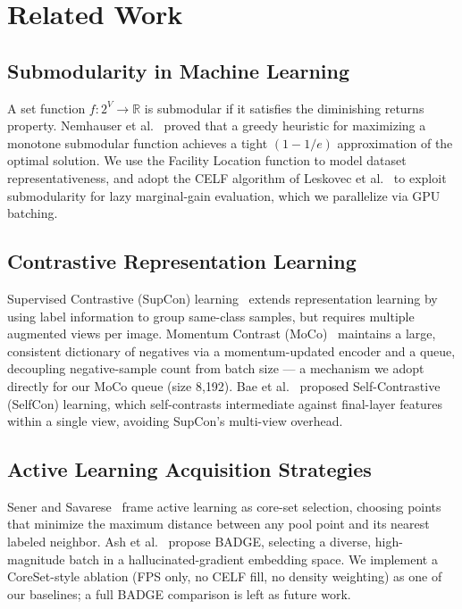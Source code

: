 \documentclass[conference]{IEEEtran}
\begin{document}
\section{Related Work}

\subsection{Submodularity in Machine Learning}
A set function $f: 2^V \to \mathbb{R}$ is submodular if it satisfies the diminishing returns property. Nemhauser et al.~\cite{nemhauser1978analysis} proved that a greedy heuristic for maximizing a monotone submodular function achieves a tight $(1-1/e)$ approximation of the optimal solution. We use the Facility Location function to model dataset representativeness, and adopt the CELF algorithm of Leskovec et al.~\cite{leskovec2007cost} to exploit submodularity for lazy marginal-gain evaluation, which we parallelize via GPU batching.

\subsection{Contrastive Representation Learning}
Supervised Contrastive (SupCon) learning~\cite{khosla2020supcon} extends representation learning by using label information to group same-class samples, but requires multiple augmented views per image. Momentum Contrast (MoCo)~\cite{he2020momentum} maintains a large, consistent dictionary of negatives via a momentum-updated encoder and a queue, decoupling negative-sample count from batch size — a mechanism we adopt directly for our MoCo queue (size 8{,}192). Bae et al.~\cite{bae2021selfcon} proposed Self-Contrastive (SelfCon) learning, which self-contrasts intermediate against final-layer features within a single view, avoiding SupCon's multi-view overhead.

\subsection{Active Learning Acquisition Strategies}
Sener and Savarese~\cite{sener2018coreset} frame active learning as core-set selection, choosing points that minimize the maximum distance between any pool point and its nearest labeled neighbor. Ash et al.~\cite{ash2020badge} propose BADGE, selecting a diverse, high-magnitude batch in a hallucinated-gradient embedding space. We implement a CoreSet-style ablation (FPS only, no CELF fill, no density weighting) as one of our baselines; a full BADGE comparison is left as future work.
\end{document}
